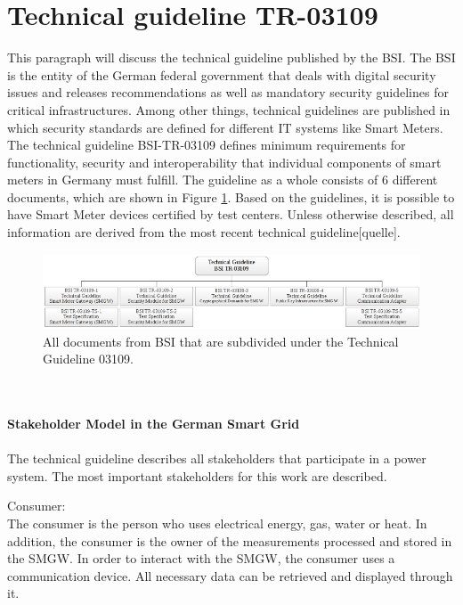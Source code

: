 \section{Technical guideline TR-03109}
This paragraph will discuss the technical guideline published by the BSI. The BSI is the entity of the German federal government that deals with digital security issues and releases recommendations as well as mandatory security guidelines for critical infrastructures. Among other things, technical guidelines are published in which security standards are defined for different IT systems like Smart Meters. The technical guideline BSI-TR-03109 defines minimum requirements for functionality, security and interoperability that individual components of smart meters in Germany must fulfill. The guideline as a whole consists of 6 different documents, which are shown in Figure \ref{fig:TG03109}. Based on the guidelines, it is possible to have Smart Meter devices certified by test centers. Unless otherwise described, all information are derived from the most recent technical guideline[quelle].\begin{figure}[tbp]
  \centering
  \includegraphics[width=1\textwidth]{images/BSI-TR-03109.png}
  \caption[Technical Guideline 03109 Overview]{All documents from BSI that are subdivided under the Technical Guideline 03109.}
  \label{fig:TG03109}
\end{figure}
\\%
\\
\textbf{Stakeholder Model in the German Smart Grid}
\label{subsec:stakeholder_model}
\\
\\
The technical guideline describes all stakeholders that participate in a power system. The most important stakeholders for this work are described.
\\\item Consumer: \\
The consumer is the person who uses electrical energy, gas, water
or heat. In addition, the consumer is the owner of the measurements processed and stored in the SMGW. In order to interact with the SMGW, the consumer uses a communication device. All necessary data can be retrieved and displayed through it.\\
